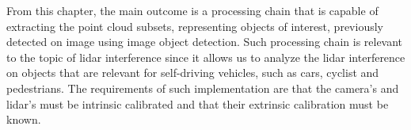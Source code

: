 From this chapter, the main outcome is a processing chain that is capable of extracting the point cloud subsets, representing objects of interest, previously detected on image using image object detection. Such processing chain is relevant to the topic of \ac{lidar} interference since it allows us to analyze the \ac{lidar} interference on objects that are relevant for self-driving vehicles, such as cars, cyclist and pedestrians. The requirements of such implementation are that the camera's and \ac{lidar}'s must be intrinsic calibrated and that their extrinsic calibration must be known.

